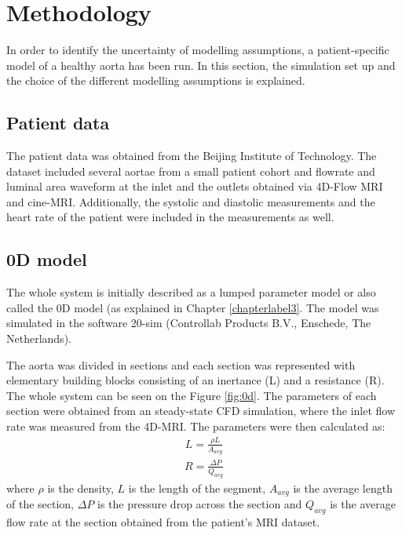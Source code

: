 \chapter{Methodology}
\label{chapterlabel5}
In order to identify the uncertainty of modelling assumptions, a patient-specific model of a healthy aorta has been run. In this section, the simulation set up and the choice of the different modelling assumptions is explained.



\section{Patient data}
The patient data was obtained from the Beijing Institute of Technology. The dataset included several aortae from a small patient cohort and flowrate and luminal area waveform at the inlet and the outlets obtained via 4D-Flow MRI and cine-MRI. Additionally, the systolic and diastolic measurements and the heart rate of the patient were included in the measurements as well. \par 

\section{0D model}
The whole system is initially described as a lumped parameter model or also called the 0D model (as explained in Chapter \ref{chapterlabel3}. The model was simulated in the software 20-sim (Controllab Products B.V., Enschede, The Netherlands). \par

The aorta was divided in sections and each section was represented with elementary building blocks consisting of an inertance (L) and a resistance (R). The whole system can be seen on the Figure \ref{fig:0d}. The parameters of each section were obtained from an steady-state CFD simulation, where the inlet flow rate was measured from the 4D-MRI. The parameters were then calculated as:
\begin{align}
    L = \frac{\rho L}{A_{avg}}
\end{align}
\begin{align}
    R = \frac{\Delta P}{Q_{avg}}
\end{align}
where $\rho$ is the density, $L$ is the length of the segment, $A_{avg}$ is the average length of the section, $\Delta P$ is the pressure drop across the section and $Q_{avg}$ is the average flow rate at the section obtained from the patient's MRI dataset.\par

